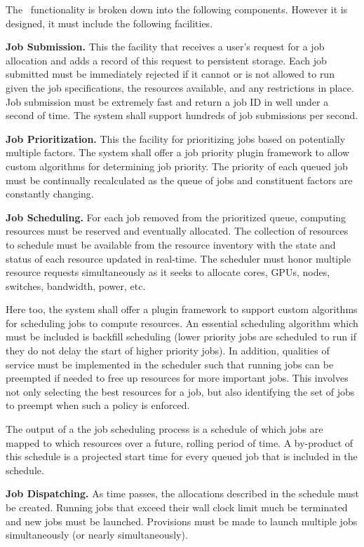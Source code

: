 The \ngjs\ functionality is broken down into the following components.
However it is designed, it must include the following facilities.

\textbf{Job Submission.} This the facility that receives a user's
request for a job allocation and adds a record of this request to
persistent storage.  Each job submitted must be immediately rejected
if it cannot or is not allowed to run given the job specifications,
the resources available, and any restrictions in place.  Job
submission must be extremely fast and return a job ID in well under a
second of time.  The system shall support hundreds of job submissions
per second.

\textbf{Job Prioritization.}  This the facility for prioritizing jobs
based on potentially multiple factors.  The system shall offer a job
priority plugin framework to allow custom algorithms for determining
job priority.  The priority of each queued job must be continually
recalculated as the queue of jobs and constituent factors are
constantly changing.

\textbf{Job Scheduling.} For each job removed from the prioritized
queue, computing resources must be reserved and eventually allocated.
The collection of resources to schedule must be available from the
resource inventory with the state and status of each resource updated in
real-time.  The scheduler must honor multiple resource requests
simultaneously as it seeks to allocate cores, GPUs, nodes, switches,
bandwidth, power, etc.

Here too, the system shall offer a plugin framework to support custom
algorithms for scheduling jobs to compute resources.  An essential
scheduling algorithm which must be included is backfill scheduling
(lower priority jobs are scheduled to run if they do not delay the
start of higher priority jobs).  In addition, qualities of service must
be implemented in the scheduler such that running jobs can be
preempted if needed to free up resources for more important jobs.
This involves not only selecting the best resources for a job, but
also identifying the set of jobs to preempt when such a policy is
enforced.

The output of a the job scheduling process is a schedule of which jobs
are mapped to which resources over a future, rolling period of time.
A by-product of this schedule is a projected start time for every
queued job that is included in the schedule.

\textbf{Job Dispatching.} As time passes, the allocations described in
the schedule must be created.  Running jobs that exceed their wall
clock limit much be terminated and new jobs must be launched.
Provisions must be made to launch multiple jobs simultaneously (or
nearly simultaneously).

